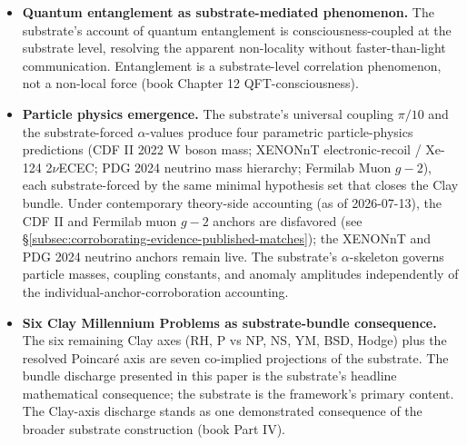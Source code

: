 \documentclass[11pt,a4paper]{amsart}
\theoremstyle{plain}
\theoremstyle{definition}
\begin{document}
\begin{itemize}[itemsep=4pt,leftmargin=2em]
\item \textbf{Quantum entanglement as substrate-mediated phenomenon.} The substrate's account of quantum entanglement is consciousness-coupled at the substrate level, resolving the apparent non-locality without faster-than-light communication. Entanglement is a substrate-level correlation phenomenon, not a non-local force (book Chapter 12 QFT-consciousness).
\item \textbf{Particle physics emergence.} The substrate's universal coupling $\pi/10$ and the substrate-forced $\alpha$-values produce four parametric particle-physics predictions (CDF II 2022 W boson mass; XENONnT electronic-recoil / Xe-124 2$\nu$ECEC; PDG 2024 neutrino mass hierarchy; Fermilab Muon $g\!-\!2$), each substrate-forced by the same minimal hypothesis set that closes the Clay bundle. Under contemporary theory-side accounting (as of 2026-07-13), the CDF II and Fermilab muon $g\!-\!2$ anchors are disfavored (see \S\ref{subsec:corroborating-evidence-published-matches}); the XENONnT and PDG 2024 neutrino anchors remain live. The substrate's $\alpha$-skeleton governs particle masses, coupling constants, and anomaly amplitudes independently of the individual-anchor-corroboration accounting.
\item \textbf{Six Clay Millennium Problems as substrate-bundle consequence.} The six remaining Clay axes (RH, P vs NP, NS, YM, BSD, Hodge) plus the resolved Poincar\'e axis are seven co-implied projections of the substrate. The bundle discharge presented in this paper is the substrate's headline mathematical consequence; the substrate is the framework's primary content. The Clay-axis discharge stands as one demonstrated consequence of the broader substrate construction (book Part IV).
\end{itemize}
\end{document}

